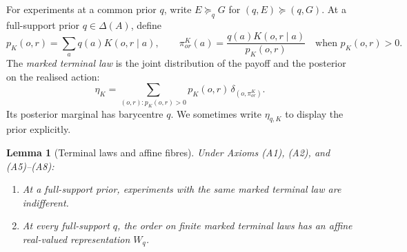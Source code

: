 \documentclass[11pt,a4paper]{article}
\newtheorem{lemma}[theorem]{Lemma}
\theoremstyle{definition}
\newcommand{\D}{\Delta}
\newcommand{\1}{\mathbf 1}
\begin{document}
For experiments at a common prior $q$, write $E\succeq_q G$ for
$(q,E)\succeq(q,G)$.  At a full-support prior $q\in\D(A)$, define
\[
p_K(o,r)=\sum_a q(a)K(o,r\mid a),\qquad
\pi^K_{or}(a)=\frac{q(a)K(o,r\mid a)}{p_K(o,r)}
\quad\text{when }p_K(o,r)>0.
\]
The \emph{marked terminal law} is the joint distribution of the payoff and
the posterior on the realised action:
\begin{equation}
\eta_K=\sum_{(o,r):p_K(o,r)>0}
p_K(o,r)\,\delta_{(o,\pi^K_{or})}.
\label{lf:eq:marked-law}
\end{equation}
Its posterior marginal has barycentre $q$.  We sometimes write $\eta_{q,K}$
to display the prior explicitly.

\begin{lemma}[Terminal laws and affine fibres]\label{lf:lem:terminal-affine}
Under Axioms \textup{(A1)}, \textup{(A2)}, and \textup{(A5)--(A8)}:
\begin{enumerate}[label=\textup{(\alph*)},leftmargin=*]
\item At a full-support prior, experiments with the same marked terminal
law are indifferent.
\item At every full-support $q$, the order on finite marked terminal laws
has an affine real-valued representation $W_q$.
\end{enumerate}
\end{lemma}
\end{document}
